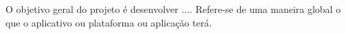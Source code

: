 \justify

O objetivo geral do projeto é desenvolver ....
Refere-se de uma maneira global o que o aplicativo ou plataforma ou aplicação terá.